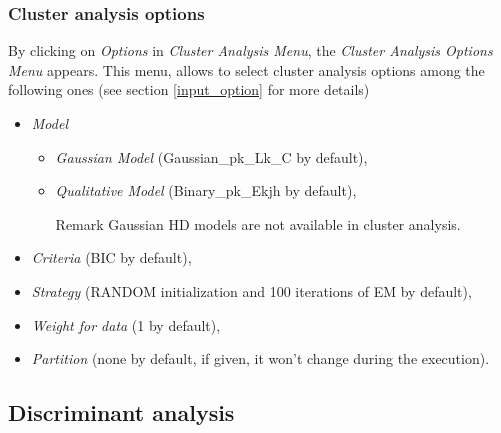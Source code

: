 %













\subsubsection{Cluster analysis options} \label{clusterAnalysisOptionsSection}

By clicking on {\em Options} in {\em Cluster Analysis Menu}, the {\em Cluster Analysis Options Menu} appears.
This menu, allows to select cluster analysis options among the following ones (see section \ref{input_option} for
more details)
\begin{itemize}
  \item {\em Model }
   \begin{itemize}
      \item {\em Gaussian Model}     (Gaussian\_pk\_Lk\_C by default),
      \item {\em Qualitative Model} (Binary\_pk\_Ekjh by default),

{\noindent  Remark Gaussian HD models are not available in cluster analysis.}

   \end{itemize}
  \item {\em Criteria} (BIC by default),
  \item {\em Strategy}  (RANDOM initialization and 100 iterations of EM by default),
  \item {\em Weight for data} (1 by default),
 \item {\em Partition} (none by default, if given, it won't change during the execution).
\end{itemize}





\subsection{Discriminant analysis}

